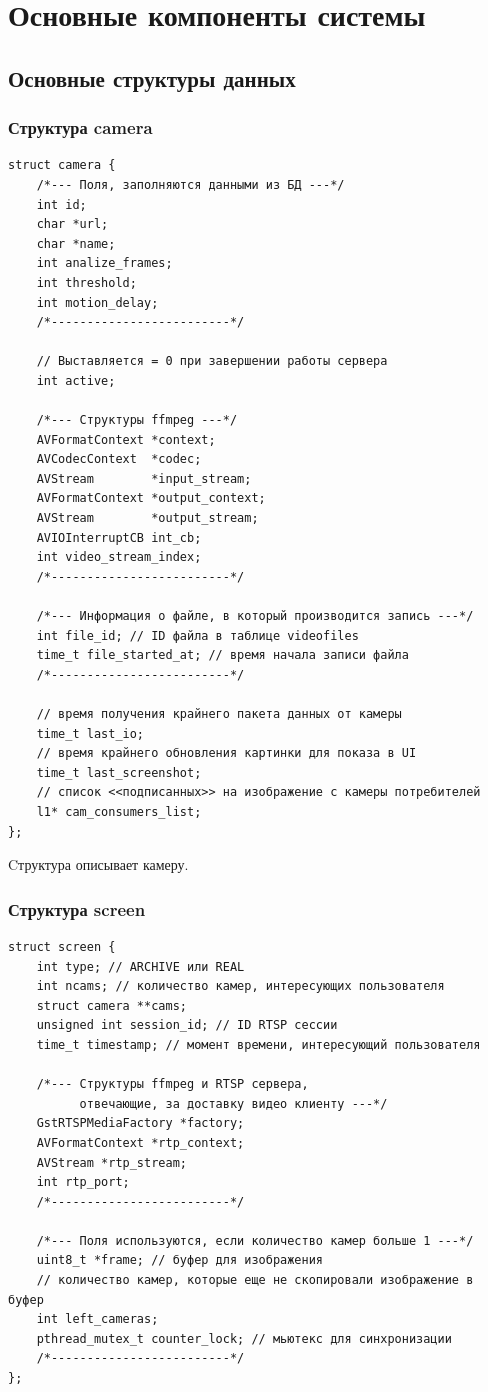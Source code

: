 \chapter{Основные компоненты системы}

\section{Основные структуры данных}

\subsection{Структура camera}
\begin{verbatim}
struct camera {
    /*--- Поля, заполняются данными из БД ---*/
    int id;
    char *url;
    char *name;
    int analize_frames;
    int threshold;
    int motion_delay;
    /*-------------------------*/
    
    // Выставляется = 0 при завершении работы сервера
    int active;
    
    /*--- Структуры ffmpeg ---*/
    AVFormatContext *context;
    AVCodecContext  *codec;
    AVStream        *input_stream;
    AVFormatContext *output_context;
    AVStream        *output_stream;
    AVIOInterruptCB int_cb;
    int video_stream_index;
    /*-------------------------*/

    /*--- Информация о файле, в который производится запись ---*/
    int file_id; // ID файла в таблице videofiles
    time_t file_started_at; // время начала записи файла
    /*-------------------------*/
    
    // время получения крайнего пакета данных от камеры
    time_t last_io;
    // время крайнего обновления картинки для показа в UI
    time_t last_screenshot;
	// список <<подписанных>> на изображение с камеры потребителей
    l1* cam_consumers_list;
};
\end{verbatim}

Cтруктура описывает камеру.

\subsection{Структура screen}
\begin{verbatim}
struct screen {
    int type; // ARCHIVE или REAL
    int ncams; // количество камер, интересующих пользователя
    struct camera **cams;
    unsigned int session_id; // ID RTSP сессии
    time_t timestamp; // момент времени, интересующий пользователя
    
    /*--- Структуры ffmpeg и RTSP сервера,
          отвечающие, за доставку видео клиенту ---*/
    GstRTSPMediaFactory *factory;
    AVFormatContext *rtp_context;
    AVStream *rtp_stream;
    int rtp_port;
    /*-------------------------*/
    
    /*--- Поля используются, если количество камер больше 1 ---*/
    uint8_t *frame; // буфер для изображения
    // количество камер, которые еще не скопировали изображение в буфер
    int left_cameras;
    pthread_mutex_t counter_lock; // мьютекс для синхронизации
    /*-------------------------*/
};
\end{verbatim}

